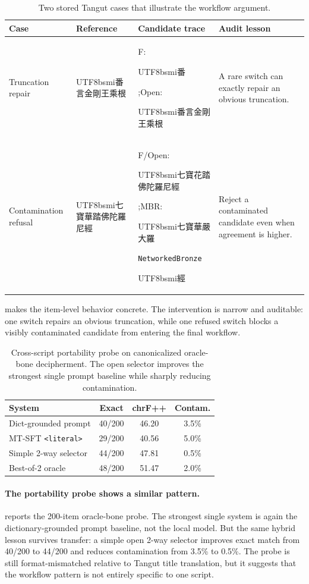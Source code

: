 \documentclass{article}
\newcommand{\zh}[1]{{\begin{CJK*}{UTF8}{bsmi}#1\end{CJK*}}}
\begin{document}
\begin{table}[t]
\centering
\scriptsize
\begin{tabularx}{\columnwidth}{@{}>{\raggedright\arraybackslash}p{}>{\raggedright\arraybackslash}p{}>{\raggedright\arraybackslash}p{}>{\raggedright\arraybackslash}X@{}}
\toprule
Case & Reference & Candidate trace & Audit lesson \\
\midrule
Truncation repair & \zh{番言金剛王乘根} & F: \zh{番};\newline Open: \zh{番言金剛王乘根} & A rare switch can exactly repair an obvious truncation. \\
Contamination refusal & \zh{七寶華踏佛陀羅尼經} & F/Open: \zh{七寶花踏佛陀羅尼經};\newline MBR: \zh{七寶華嚴大羅}\texttt{Networked\hspace{0pt}Bronze}\zh{經} & Reject a contaminated candidate even when agreement is higher. \\
\bottomrule
\end{tabularx}
\caption{Two stored Tangut cases that illustrate the workflow argument.}
\label{tab:cases}
\end{table}

 makes the item-level behavior concrete. The intervention is narrow and auditable: one switch repairs an obvious truncation, while one refused switch blocks a visibly contaminated candidate from entering the final workflow.

\begin{table}[t]
\centering
\small
\begin{tabular}{lccc}
\toprule
System & Exact & chrF++ & Contam. \\
\midrule
Dict-grounded prompt & 40/200 & 46.20 & 3.5\% \\
MT-SFT \texttt{<literal>} & 29/200 & 40.56 & 5.0\% \\
Simple 2-way selector & 44/200 & 47.81 & 0.5\% \\
Best-of-2 oracle & 48/200 & 51.47 & 2.0\% \\
\bottomrule
\end{tabular}
\caption{Cross-script portability probe on canonicalized oracle-bone decipherment. The open selector improves the strongest single prompt baseline while sharply reducing contamination.}
\label{tab:evobc}
\end{table}

\paragraph{The portability probe shows a similar pattern.}
 reports the 200-item oracle-bone probe. The strongest single system is again the dictionary-grounded prompt baseline, not the local model. But the same hybrid lesson survives transfer: a simple open 2-way selector improves exact match from 40/200 to 44/200 and reduces contamination from 3.5\% to 0.5\%. The probe is still format-mismatched relative to Tangut title translation, but it suggests that the workflow pattern is not entirely specific to one script.
\end{document}

